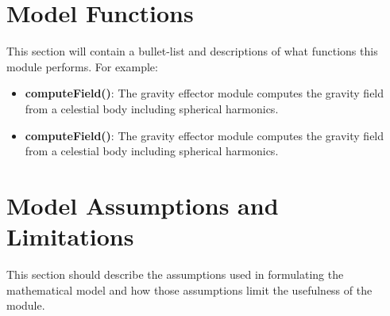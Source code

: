 \section{Model Functions}
This section will contain a bullet-list and descriptions of what functions this module performs. For example:
\begin{itemize}
	\item \textbf{computeField()}: The gravity effector module computes the gravity field from a celestial body including spherical harmonics.
	\item \textbf{computeField()}: The gravity effector module computes the gravity field from a celestial body including spherical harmonics.
\end{itemize}

\section{Model Assumptions and Limitations}
This section should describe the assumptions used in formulating the mathematical model and how those assumptions limit the usefulness of the module.